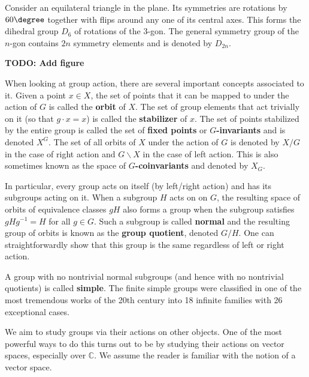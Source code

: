 		\begin{eg}
			Consider an equilateral triangle in the plane. Its symmetries are rotations by $60\degree$ together with flips around any one of its central axes. This forms the dihedral group $D_6$ of rotations of the $3$-gon. The general symmetry group of the $n$-gon contains $2n$ symmetry elements and is denoted by $D_{2n}$.
		\end{eg}
		\textbf{TODO: Add figure}

		When looking at group action, there are several important concepts associated to it. Given a point $x \in X$, the set of points that it can be mapped to under the action of $G$ is called the \textbf{orbit} of $X$. The set of group elements that act trivially on it (so that $g \cdot x = x$) is called the \textbf{stabilizer} of $x$. The set of points stabilized by the entire group is called the set of \textbf{fixed points} or $G$\textbf{-invariants} and is denoted $X^G$. The set of all orbits of $X$ under the action of $G$ is denoted by $X/G$ in the case of right action and $G\backslash X$ in the case of left action. This is also sometimes known as the space of $G$\textbf{-coinvariants} and denoted by $X_G$.
		
		In particular, every group acts on itself (by left/right action) and has its subgroups acting on it. When a subgroup $H$ acts on on $G$, the resulting space of orbits of equivalence classes $g H$ also forms a group when the subgroup satisfies $g H g^{-1} = H$ for all $g \in G$. Such a subgroup is called \textbf{normal} and the resulting group of orbits is known as the \textbf{group quotient}, denoted $G/H$. One can straightforwardly show that this group is the same regardless of left or right action.
		
		A group with no nontrivial normal subgroups (and hence with no nontrivial quotients) is called \textbf{simple}. The finite simple groups were classified in one of the most tremendous works of the 20th century into 18 infinite families with 26 exceptional cases. 
		
		We aim to study groups via their actions on other objects. One of the most powerful ways to do this turns out to be by studying their actions on vector spaces, especially over $\mathbb C$. We assume the reader is familiar with the notion of a vector space.
		

